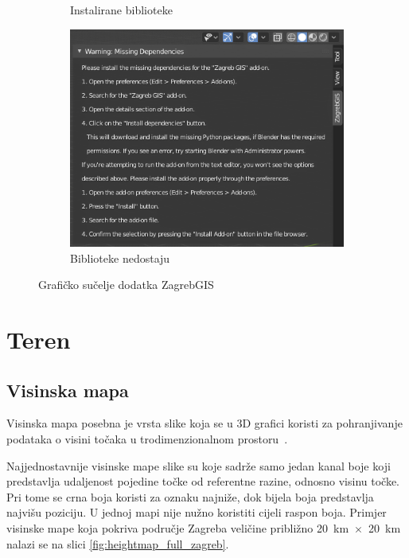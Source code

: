 \documentclass[times, utf8, zavrsni, numeric]{fer}
\begin{document}
\begin{figure}[ht]
\begin{subfigure}[t]{.317\textwidth}
			\caption{Instalirane biblioteke}
			\label{fig:addon_gui}
		\end{subfigure}
		\hfill
		\begin{subfigure}[t]{.67\textwidth}
			\includegraphics[width=\linewidth,right]{figures/install_dependencies_warning.png}
			\captionsetup{margin=.4cm}
			\caption{Biblioteke nedostaju}
			\label{fig:install_dependencies_warning}
		\end{subfigure}
		\caption{Grafičko sučelje dodatka ZagrebGIS}
		\label{fig:addon_gui_examples}
	\end{figure}



\chapter{Teren}

	\section{Visinska mapa}
	
		Visinska mapa  posebna je vrsta slike koja se u 3D grafici koristi za pohranjivanje podataka o visini točaka u trodimenzionalnom prostoru~\cite{jankovic2010}.
		
		Najjednostavnije visinske mape slike su koje sadrže samo jedan kanal boje koji predstavlja udaljenost pojedine točke od referentne razine, odnosno visinu točke.
		Pri tome se crna boja koristi za oznaku najniže, dok bijela boja predstavlja najvišu poziciju.
		U jednoj mapi nije nužno koristiti cijeli raspon boja.
		Primjer visinske mape koja pokriva područje Zagreba veličine približno \SI{20}{\kilo\meter}~$\times$~\SI{20}{\kilo\meter} nalazi se na slici \ref{fig:heightmap_full_zagreb}.
		
\end{document}
